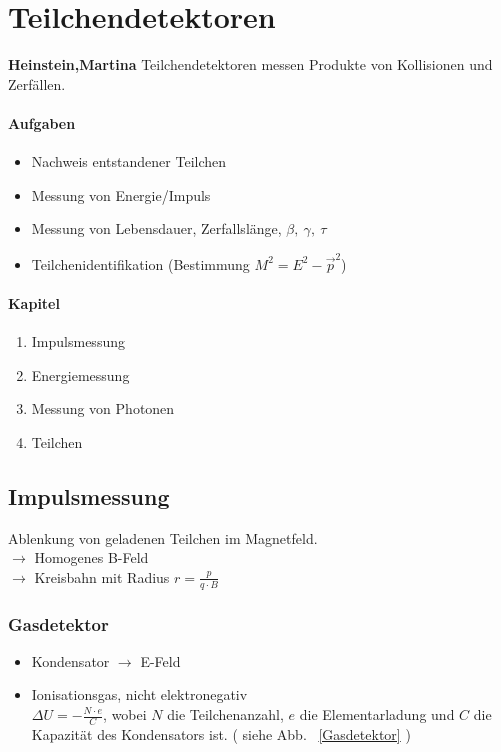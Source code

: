 \documentclass[Ex4_Zusammenfassung.tex]{subfiles}
\begin{document}
\chapter{Teilchendetektoren}
\textbf{Heinstein,Martina} \newline
Teilchendetektoren messen Produkte von Kollisionen und Zerfällen.

\subsubsection{Aufgaben}
\begin{itemize}
	\item Nachweis entstandener Teilchen
	\item Messung von Energie/Impuls
	\item Messung von Lebensdauer, Zerfallslänge, $\beta,\ \gamma,\ \tau$
	\item Teilchenidentifikation (Bestimmung $M^2 = E^2 - \vec{p}^2$)
\end{itemize}

\subsubsection{Kapitel}
\begin{enumerate}[\hspace{0.5cm}{4.}1]
\item Impulsmessung
\item Energiemessung
\item Messung von Photonen
\item Teilchen
\end{enumerate}

\section{Impulsmessung}
Ablenkung von geladenen Teilchen im Magnetfeld.\\
$\rightarrow$ Homogenes B-Feld\\
$\rightarrow$ Kreisbahn mit Radius $r=\frac{p}{q\cdot B}$

\subsection{Gasdetektor}
\begin{itemize}
	\item Kondensator $\rightarrow$ E-Feld
	\item Ionisationsgas, nicht elektronegativ\\ $\Delta U = -\frac{N\cdot e }{C}$, wobei $N$ die Teilchenanzahl, $e$ die Elementarladung und $C$ die Kapazität des Kondensators ist. ( siehe Abb. ~\ref{Gasdetektor} )
\end{itemize}
\end{document}
